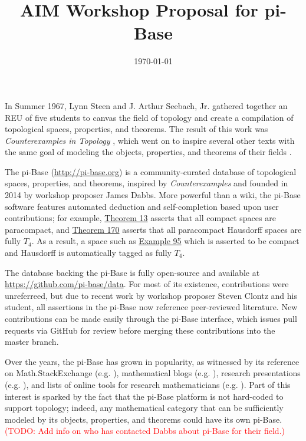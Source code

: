 \documentclass{amsart}
\title{AIM Workshop Proposal for pi-Base}
\date{\today}
\newcommand{\TODO}[1]{\textcolor{red}{(TODO: #1)}}
\begin{document}
\maketitle


In Summer 1967, Lynn Steen and J. Arthur Seebach, Jr. gathered together
an REU of five students to canvas the field of topology and create
a compilation of topological spaces, properties, and theorems.
The result of this work was \textit{Counterexamples in Topology} 
\cite{MR1382863}, which went on to inspire several other texts
with the same goal of modeling the objects, properties, and theorems of
their fields \cite{MR0491272,MR1113487,MR930671,MR1256489}.

The pi-Base (\url{http://pi-base.org}) is a community-curated
database of topological spaces, properties, and theorems, 
inspired by \textit{Counterexamples} and founded in 2014 by
workshop proposer James Dabbs. More
powerful than a wiki, the pi-Base software features automated
deduction and self-completion based upon user contributions;
for example,
\href{https://topology.pi-base.org/theorems/I000013}{Theorem 13}
asserts that all compact spaces are paracompact,
and
\href{https://topology.pi-base.org/theorems/I000170}{Theorem 170}
asserts that all paracompact Hausdorff spaces are fully \(T_4\).
As a result, a space such as
\href{https://topology.pi-base.org/spaces/S000095}{Example 95}
which is asserted to be compact and Hausdorff is automatically tagged
as fully \(T_4\). 

The database backing the pi-Base is fully open-source and available
at \url{https://github.com/pi-base/data}.
For most of its existence, contributions were
unreferreed, but due to recent work by workshop proposer Steven Clontz
and his student,
all assertions in the pi-Base now reference peer-reviewed literature.
New contributions can be made easily through the pi-Base interface,
which issues pull requests via GitHub for review before merging 
these contributions into the master branch.

Over the years, the pi-Base has grown in popularity,
as witnessed by its reference on Math.StackExchange 
(e.g. \cite{157918}), mathematical blogs (e.g. \cite{lamb_2018}),
research presentations (e.g. \cite{clontzPiBase}),
and lists of online tools for research mathematicians 
(e.g. \cite{scheepersPiBase}). Part of this interest is sparked
by the fact that the pi-Base platform is not
hard-coded to support topology; indeed,
any mathematical category that can be sufficiently modeled by
its objects, properties, and theorems could have its own
pi-Base. 
\TODO{Add info on who has contacted Dabbs about pi-Base for their field.}
\end{document}
